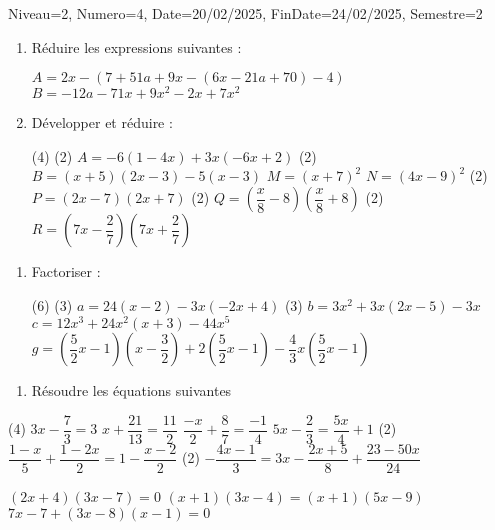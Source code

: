 \documentclass[a4paper,12pt]{article}
\begin{document}
\begin{Maquette}[DM]{Niveau=2, Numero=4, Date=20/02/2025, FinDate=24/02/2025, Semestre=2}

\begin{exercice}
\begin{enumerate}
\item Réduire les expressions suivantes :
\begin{tasks}[style=itemize]
\task $A=2x-\left(7+51a+9x-\left(6x-21a+70\right)-4\right)$
\task $B=-12a-71x+9x^{2}-2x+7x^{2}$
\end{tasks}
\item Développer et réduire :
\begin{tasks}[style=itemize](4)
\task*(2) $A=-6\left(1-4x\right)+3x\left(-6x+2\right)$
\task*(2) $B=\left(x+5\right)\left(2x-3\right)-5\left(x-3\right)$
\task $M=\left(x+7\right)^{2}$
\task $N=\left(4x-9\right)^{2}$
\task*(2) $P=\left(2x-7\right)\left(2x+7\right)$
\task*(2) $Q=\left(\dfrac{x}{8}-8\right)\left(\dfrac{x}{8}+8\right)$
\task*(2) $R=\left(7x-\dfrac{2}{7}\right)\left(7x+\dfrac{2}{7}\right)$
\end{tasks}
\end{enumerate}
\end{exercice}

\begin{exercice}
\begin{enumerate}
\item Factoriser :
\begin{tasks}[style=itemize](6)
\task*(3) $a=24\left(x-2\right)-3x\left(-2x+4\right)$
\task*(3) $b=3x^{2}+3x\left(2x-5\right)-3x$
\task* $c=12x^{3}+24x^{2}\left(x+3\right)-44x^{5}$
\task* $g=\left(\dfrac{5}{2}x-1\right)\left(x-\dfrac{3}{2}\right)+2\left(\dfrac{5}{2}x-1\right)-\dfrac{4}{3}x\left(\dfrac{5}{2}x-1\right)$
\end{tasks}
\end{enumerate}
\end{exercice}

\begin{exercice}
\begin{enumerate}
\item Résoudre les équations suivantes 
\end{enumerate}
\begin{tasks}[style=itemize](4)
\task $3x-\dfrac{7}{3}=3$
\task $x+\dfrac{21}{13}=\dfrac{11}{2}$
\task $\dfrac{-x}{2}+\dfrac{8}{7}=\dfrac{-1}{4}$
\task $5x-\dfrac{2}{3}=\dfrac{5x}{4}+1$
\task*(2) $\dfrac{1-x}{5}+\dfrac{1-2x}{2}=1-\dfrac{x-2}{2}$
\task*(2) $-\dfrac{4x-1}{3}=3x-\dfrac{2x+5}{8}+\dfrac{23-50x}{24}$
\end{tasks}
\begin{tasks}
\task $(2x+4)(3x-7)=0$
\task $(x+1)(3x-4)=(x+1)(5x-9)$
\task $7x-7+(3x-8)(x-1)=0$
\end{tasks}
\end{exercice}


\end{Maquette}
\end{document}
